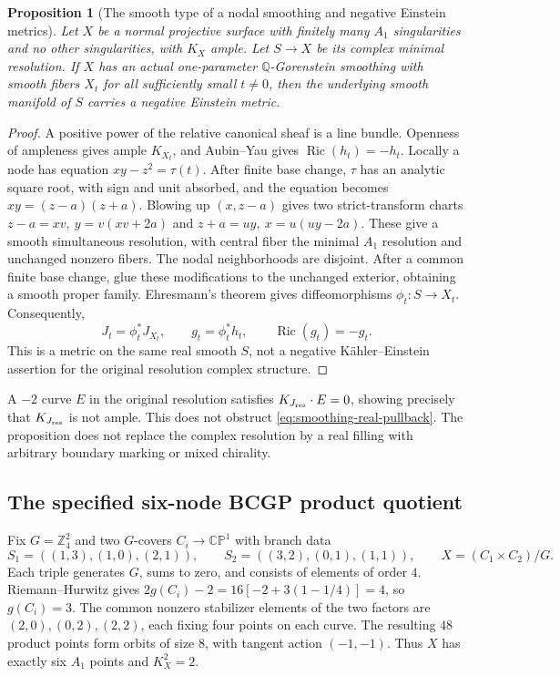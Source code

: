 \documentclass[a4paper,11pt]{article}
\numberwithin{equation}{section}
\newtheorem{proposition}[theorem]{Proposition}
\theoremstyle{definition}
\newcommand{\Ric}{\operatorname{Ric}}
\newcommand{\CP}{\mathbb{CP}}
\newcommand{\Z}{\mathbb Z}
\begin{document}
\begin{proposition}[The smooth type of a nodal smoothing and negative Einstein metrics]\label{prop:nodal-smoothing-existence}
Let $X$ be a normal projective surface with finitely many $A_1$ singularities and no other singularities, with $K_X$ ample.
Let $S\to X$ be its complex minimal resolution.
If $X$ has an actual one-parameter $\mathbb Q$-Gorenstein smoothing with smooth fibers $X_t$ for all sufficiently small $t\ne0$, then the underlying smooth manifold of $S$ carries a negative Einstein metric.
\end{proposition}
\begin{proof}
A positive power of the relative canonical sheaf is a line bundle. Openness of ampleness gives ample $K_{X_t}$, and Aubin--Yau gives $\Ric(h_t)=-h_t$.
Locally a node has equation $xy-z^2=\tau(t)$. After finite base change, $\tau$ has an analytic square root, with sign and unit absorbed, and the equation becomes $xy=(z-a)(z+a)$.
Blowing up $(x,z-a)$ gives two strict-transform charts
$z-a=xv,\ y=v(xv+2a)$ and $z+a=uy,\ x=u(uy-2a)$.
These give a smooth simultaneous resolution, with central fiber the minimal $A_1$ resolution and unchanged nonzero fibers.
The nodal neighborhoods are disjoint. After a common finite base change, glue these modifications to the unchanged exterior, obtaining a smooth proper family.
Ehresmann's theorem gives diffeomorphisms $\phi_t:S\to X_t$. Consequently,
\begin{equation}\label{eq:smoothing-real-pullback}
 J_t=\phi_t^*J_{X_t},\qquad g_t=\phi_t^*h_t,\qquad \Ric(g_t)=-g_t.
\end{equation}
This is a metric on the same real smooth $S$, not a negative K\"ahler--Einstein assertion for the original resolution complex structure.
\end{proof}
A $-2$ curve $E$ in the original resolution satisfies $K_{J_{\rm res}}\cdot E=0$, showing precisely that $K_{J_{\rm res}}$ is not ample.
This does not obstruct \eqref{eq:smoothing-real-pullback}.
The proposition does not replace the complex resolution by a real filling with arbitrary boundary marking or mixed chirality.

\subsection{The specified six-node BCGP product quotient}\label{sec:bcgp-global-object}
Fix $G=\Z_4^2$ and two $G$-covers $C_i\to\CP^1$ with branch data
\begin{equation}\label{eq:bcgp-global-data}
 S_1=((1,3),(1,0),(2,1)),\qquad
 S_2=((3,2),(0,1),(1,1)),\qquad X=(C_1\times C_2)/G.
\end{equation}
Each triple generates $G$, sums to zero, and consists of elements of order $4$.
Riemann--Hurwitz gives $2g(C_i)-2=16[-2+3(1-1/4)]=4$, so $g(C_i)=3$.
The common nonzero stabilizer elements of the two factors are $(2,0),(0,2),(2,2)$, each fixing four points on each curve.
The resulting $48$ product points form orbits of size $8$, with tangent action $(-1,-1)$.
Thus $X$ has exactly six $A_1$ points and $K_X^2=2$.
\end{document}
